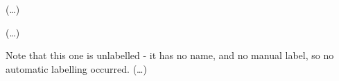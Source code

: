 
\begin{RpgMap}[
        header-offset=1,%
        title={Example Map}
    ]

	\RpgShowMapRefs{}
    
	
     
        (\dots)%
    

            (\dots)%

            \begin{RpgMap}[
                blank-prefix={Tomb~}
                ]
                \RpgArea{}
                    Note that this one is unlabelled - it has no name, and no manual label, so no automatic labelling occurred.
                    (\dots)%
            \end{RpgMap}
\end{RpgMap}
